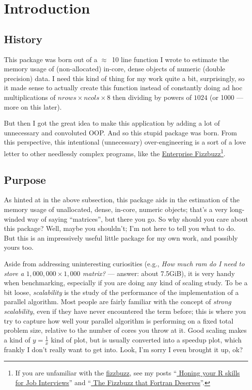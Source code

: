 \section{Introduction}

\subsection{History}

This package was born out of a $\approx$~10 line function I wrote to estimate 
the memory usage of (non-allocated) in-core, dense \R objects of 
numeric (double precision) data.  I need this kind of thing for my 
work quite a bit, surprisingly, so it made sense to actually 
create this function instead of constantly doing ad hoc multiplications of 
$nrows\times ncols \times 8$ then dividing by powers of $1024$ (or 1000 --- 
more on this later).

But then I got the great idea to make this application  by adding a lot of unnecessary and convoluted OOP.  And so this 
stupid package was born.  From this perspective, this intentional 
(unnecessary) over-engineering is a sort of a love letter to other needlessly 
complex programs, like the 
\href{https://github.com/Mikkeren/FizzBuzzEnterpriseEdition}{Enterprise 
Fizzbuzz}\footnote{If you are unfamiliar with the 
\href{https://en.wikipedia.org/wiki/Bizz_buzz}{fizzbuzz}, see my posts ``\href{
http://librestats.com/2012/01/10/honing-your-r-skills-for-job-interviews/}{
Honing your R skills for Job Interviews}'' and 
``\href{http://librestats.com/2013/04/26/the-fizzbuzz-that-fortran-deserves/}{
The Fizzbuzz that Fortran Deserves}''.}.


\subsection{Purpose}

As hinted at in the above subsection, this package aids in the estimation of 
the memory usage of unallocated, dense, in-core, numeric objects; that's a 
very long-winded way of saying ``matrices'', but there you go.  So why should 
you care about this package?  Well, maybe you shouldn't; I'm not here to tell 
you what to do.  But this is an impressively useful little package for my own 
work, and possibly yours too. 
  
Aside from addressing uninteresting curiosities (e.g., \emph{How much ram do I 
need to store a $1,000,000\times 1,000$ matrix?} --- answer: about 7.5GiB), it 
is very handy when benchmarking, especially if you are doing any kind of 
scaling study. To be a bit loose, \emph{scalability} is the study of the 
performance of the implementation of a parallel algorithm.   Most people are 
fairly familiar with the concept of \emph{strong scalability}, even if they have 
never encountered the term before; this is where you try to capture how well 
your parallel algorithm is performing on a fixed total problem size, relative to 
the number of cores you throw at it.  Good scaling makes a kind of 
$y=\frac{1}{x}$ kind of plot, but is usually converted into a speedup plot, 
which frankly I don't really want to get into.  Look, I'm sorry I even brought 
it up, ok?

